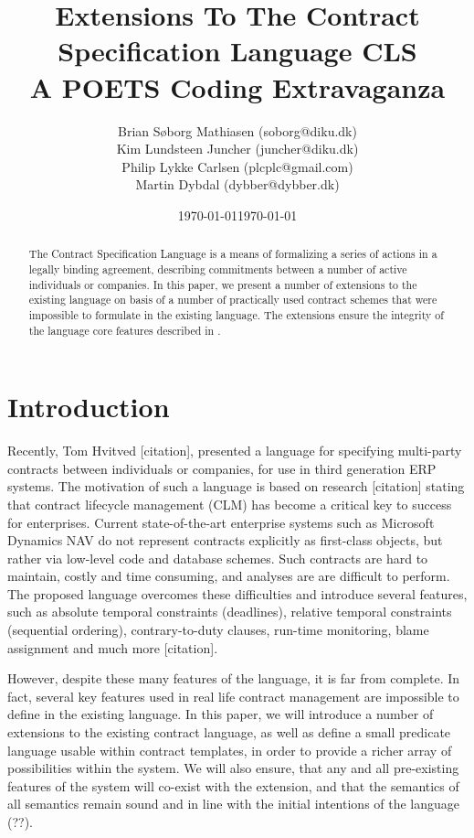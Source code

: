 \documentclass[a4paper,oneside, final, twocolumn]{memoir}
\title{Extensions To The Contract Specification Language CLS\\
        \small{A POETS Coding Extravaganza}}
\author{Brian Søborg Mathiasen (soborg@diku.dk) \\ Kim Lundsteen Juncher (juncher@diku.dk) \\ Philip Lykke Carlsen (plcplc@gmail.com) \\ Martin Dybdal (dybber@dybber.dk)}
\date{\today} %
\date{\today}
\begin{document}
\maketitle
\newpage
\begin{abstract}
The Contract Specification Language is a means of formalizing a
series of actions in a legally binding agreement, describing commitments between
a number of active individuals or companies. In this paper, we present a number
of extensions to the existing language on basis of a number of practically used
contract schemes that were impossible to formulate in the existing language. The
extensions ensure the integrity of the language core features described in
\cite{hvitved10}.
\end{abstract}

\chapter{Introduction}
Recently, Tom Hvitved [citation], presented a language for specifying
multi-party contracts between individuals or companies, for use in third
generation ERP systems. The motivation of such a language is based on research
[citation] stating that contract lifecycle management (CLM) has become a
critical key to success for enterprises. Current state-of-the-art enterprise
systems such as Microsoft Dynamics NAV do not represent contracts explicitly as
first-class objects, but rather via low-level code and database schemes. Such
contracts are hard to maintain, costly and time consuming, and analyses are are
difficult to perform. The proposed language overcomes these difficulties and
introduce several features, such as absolute temporal constraints (deadlines),
relative temporal constraints (sequential ordering), contrary-to-duty clauses,
run-time monitoring, blame assignment and much more [citation].

However, despite these many features of the language, it is far from complete.
In fact, several key features used in real life contract management are
impossible to define in the existing language. In this paper, we will introduce
a number of extensions to the existing contract language, as well as define a
small predicate language usable within contract templates, in order to provide a
richer array of possibilities within the system. We will also ensure, that any
and all pre-existing features of the system will co-exist with the extension,
and that the semantics of all semantics remain sound and in line with the
initial intentions of the language (??).
\end{document}
